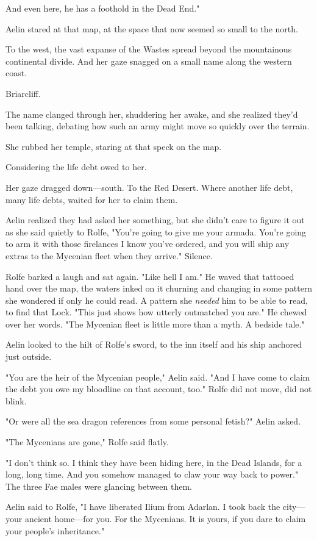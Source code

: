 And even here, he has a foothold in the Dead End."

Aelin stared at that map, at the space that now seemed so small to the north.

To the west, the vast expanse of the Wastes spread beyond the mountainous continental divide.
And her gaze snagged on a small name along the western coast.

Briarcliff.

The name clanged through her, shuddering her awake, and she realized they'd been talking, debating how such an army might move so quickly over the terrain.

She rubbed her temple, staring at that speck on the map.

Considering the life debt owed to her.

Her gaze dragged down---south.
To the Red Desert.
Where another life debt, many life debts, waited for her to claim them.

Aelin realized they had asked her something, but she didn't care to figure it out as she said quietly to Rolfe, "You're going to give me your armada.
You're going to arm it with those firelances I know you've ordered, and you will ship any extras to the Mycenian fleet when they arrive."
Silence.

Rolfe barked a laugh and sat again.
"Like hell I am."
He waved that tattooed hand over the map, the waters inked on it churning and changing in some pattern she wondered if only he could read.
A pattern she \emph{needed} him to be able to read, to find that Lock.
"This just shows how utterly outmatched you are."
He chewed over her words.
"The Mycenian fleet is little more than a myth.
A bedside tale."

Aelin looked to the hilt of Rolfe's sword, to the inn itself and his ship anchored just outside.

"You are the heir of the Mycenian people," Aelin said.
"And I have come to claim the debt you owe my bloodline on that account, too."
Rolfe did not move, did not blink.

"Or were all the sea dragon references from some personal fetish?"
Aelin asked.

"The Mycenians are gone," Rolfe said flatly.

"I don't think so.
I think they have been hiding here, in the Dead Islands, for a long, long time.
And you somehow managed to claw your way back to power."
The three Fae males were glancing between them.

Aelin said to Rolfe, "I have liberated Ilium from Adarlan.
I took back the city---your ancient home---for you.
For the Mycenians.
It is yours, if you dare to claim your people's inheritance."

